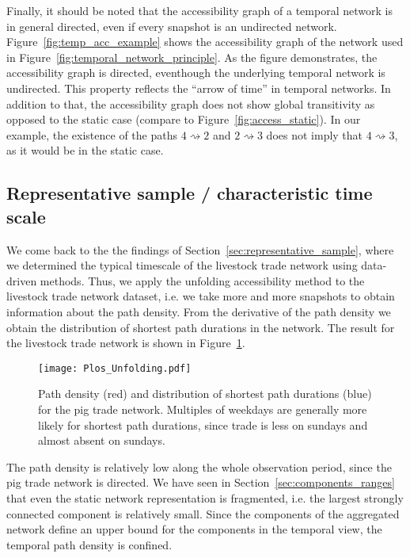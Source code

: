 Finally, it should be noted that the accessibility graph of a temporal network is in general directed, even if every snapshot is an undirected network.
Figure~\ref{fig:temp_acc_example} shows the accessibility graph of the network used in Figure~\ref{fig:temporal_network_principle}.
As the figure demonstrates, the accessibility graph is directed, eventhough the underlying temporal network is undirected.
This property reflects the ``arrow of time'' in temporal networks.
In addition to that, the accessibility graph does not show global transitivity as opposed to the static case (compare to Figure~\ref{fig:access_static}).
In our example, the existence of the paths $4\rightsquigarrow 2$ and $2\rightsquigarrow 3$ does not imply that $4\rightsquigarrow 3$, as it would be in the static case.
 
\subsection{Representative sample / characteristic time scale}
We come back to the the findings of Section~\ref{sec:representative_sample}, where we determined the typical timescale of the livestock trade network using data-driven methods.
Thus, we apply the unfolding accessibility method to the livestock trade network dataset, i.e. we take more and more snapshots to obtain information about the path density.
From the derivative of the path density we obtain the distribution of shortest path durations in the network.
The result for the livestock trade network is shown in Figure~\ref{fig:plos_unfolding}.
%
\begin{figure}[htb]
\begin{center}
\texttt{[image: Plos\_Unfolding.pdf]}
\caption{Path density (red) and distribution of shortest path durations (blue) for the pig trade network.
Multiples of weekdays are generally more likely for shortest path durations, since trade is less on sundays and almost absent on sundays.}
\label{fig:plos_unfolding}
\end{center}
\end{figure}
%
The path density is relatively low along the whole observation period, since the pig trade network is directed.
We have seen in Section~\ref{sec:components_ranges} that even the static network representation is fragmented, i.e. the largest strongly connected component is relatively small.
Since the components of the aggregated network define an upper bound for the components in the temporal view, the temporal path density is confined.

